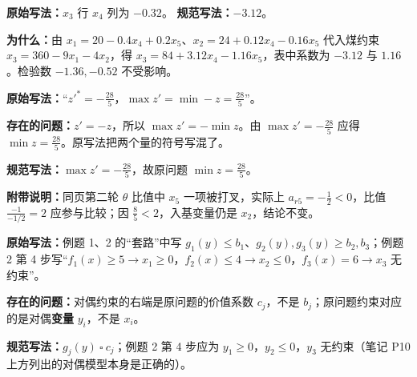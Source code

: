 \begin{correctionbox}
\textbf{原始写法：}$x_3$ 行 $x_4$ 列为 $-0.32$。\quad
\textbf{规范写法：}$-3.12$。\par
\textbf{为什么：}由 $x_1=20-0.4x_4+0.2x_5$、$x_2=24+0.12x_4-0.16x_5$ 代入煤约束 $x_3=360-9x_1-4x_2$，得 $x_3=84+3.12x_4-1.16x_5$，表中系数为 $-3.12$ 与 $1.16$。检验数 $-1.36,-0.52$ 不受影响。
\end{correctionbox}

\begin{correctionbox}
\textbf{原始写法：}“$z'^*=-\frac{28}{5}$，$\max z'=\min -z=\frac{28}{5}$”。\par
\textbf{存在的问题：}$z'=-z$，所以 $\max z'=-\min z$。由 $\max z'=-\frac{28}{5}$ 应得 $\min z=\frac{28}{5}$。原写法把两个量的符号写混了。\par
\textbf{规范写法：}$\max z'=-\frac{28}{5}$，故原问题 $\min z=\frac{28}{5}$。\par
\textbf{附带说明：}同页第二轮 $\theta$ 比值中 $x_5$ 一项被打叉，实际上 $a_{r5}=-\frac12<0$，比值 $\frac{-1}{-1/2}=2$ 应参与比较；因 $\frac85<2$，入基变量仍是 $x_2$，结论不变。
\end{correctionbox}

\begin{correctionbox}
\textbf{原始写法：}例题 1、2 的“套路”中写 $g_1(y)\le b_1$、$g_2(y),g_3(y)\ge b_2,b_3$；例题 2 第 4 步写“$f_1(x)\ge5\to x_1\ge0$，$f_2(x)\le4\to x_2\le0$，$f_3(x)=6\to x_3$ 无约束”。\par
\textbf{存在的问题：}对偶约束的右端是原问题的价值系数 $c_j$，不是 $b_j$；原问题约束对应的是对偶\textbf{变量} $y_i$，不是 $x_i$。\par
\textbf{规范写法：}$g_j(y)\ \square\ c_j$；例题 2 第 4 步应为 $y_1\ge0$，$y_2\le0$，$y_3$ 无约束（笔记 P10 上方列出的对偶模型本身是正确的）。
\end{correctionbox}

